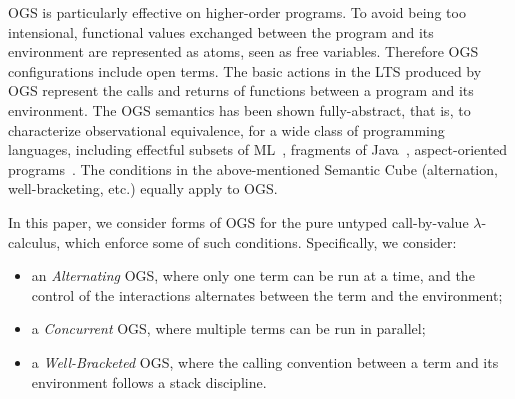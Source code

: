 OGS is particularly effective on higher-order programs.
To avoid being too intensional, functional values exchanged between the program and its environment 
are represented as atoms, seen as free variables.  
Therefore OGS configurations include open terms. 
The basic actions in the LTS produced by OGS represent
the calls and returns of functions between
a program
and its environment.
The OGS semantics
has been shown  fully-abstract, that is, to characterize observational equivalence,
for a wide class of
programming languages, including effectful subsets of 
ML~\cite{laird2007,10.1145/2933575.2934509},
fragments of Java~\cite{jeffrey2005java}, aspect-oriented 
programs~\cite{jagadeesan2009open}. 
The conditions  in the above-mentioned Semantic Cube (alternation,
well-bracketing, etc.)
 equally apply to OGS.

In this paper, we consider forms of OGS
for the  pure untyped call-by-value  $\lambda$-calculus,
which enforce some of such conditions.
Specifically, we consider:
\begin{itemize}
 \item an \emph{Alternating} OGS, where only one term can be run at a time, and 
the control of the interactions alternates between the  term and the environment;
 \item a \emph{Concurrent} OGS, where multiple terms can be run in parallel;
\item a \emph{Well-Bracketed} OGS, where the calling convention between a term and its
environment follows a stack discipline.
\end{itemize}


